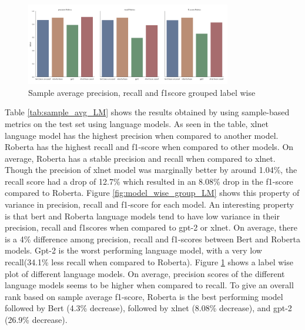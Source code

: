 \begin{figure}[h!]
    \centering
    \includegraphics[width=0.8\textwidth]{thesis/figures/labelwise_wise_prf.png}
    \caption{Sample average precision, recall and f1score grouped label wise }
    \label{fig:label_wise_group_LM}
\end{figure}
Table \ref{tab:sample_avg_LM} shows the results obtained by using sample-based metrics on the test set using language models. As seen in the table, xlnet language model has the highest precision when compared to another model.  Roberta has the highest recall and f1-score when compared to other models. On average, Roberta has a stable precision and recall when compared to xlnet. Though the precision of xlnet model was marginally better by around 1.04\%, the recall score had a drop of 12.7\%  which resulted in an 8.08\% drop in the f1-score compared to Roberta. Figure \ref{fig:model_wise_group_LM} shows this property of variance in precision, recall and f1-score for each model. An interesting property is that bert and Roberta language models tend to have low variance in their precision, recall and f1scores when compared to gpt-2 or xlnet. On average, there is a 4\% difference among precision, recall and f1-scores between Bert and Roberta models. Gpt-2 is the worst performing language model, with a very low recall(34.1\% less recall when compared to Roberta). Figure \ref{fig:label_wise_group_LM} shows a label wise plot of different language models. On average, precision scores of the different language models seems to be higher when compared to recall. To give an overall rank based on sample average f1-score, Roberta is the best performing model followed by Bert (4.3\% decrease), followed by xlnet (8.08\% decrease), and gpt-2 (26.9\% decrease). 


